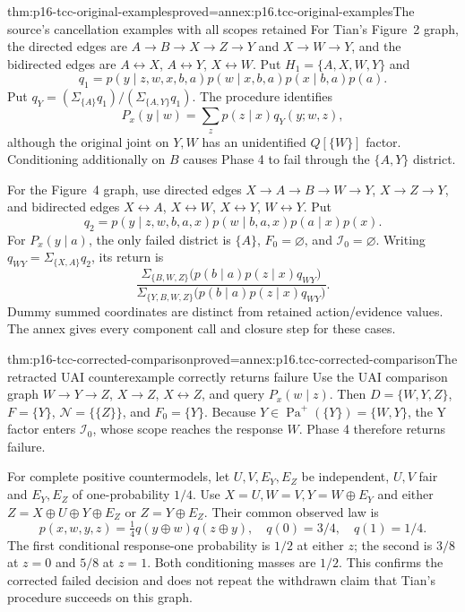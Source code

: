 \begin{hbtheorem}{thm:p16-tcc-original-examples}{proved=annex:p16.tcc-original-examples}{The source's cancellation examples with all scopes retained}
For Tian's Figure~2 graph, the directed edges are
\(A\to B\to X\to Z\to Y\) and \(X\to W\to Y\),
and the bidirected edges are \(A\leftrightarrow X\),
\(A\leftrightarrow Y\), \(X\leftrightarrow W\).
Put \(H_1=\{A,X,W,Y\}\) and
\[
 q_1=p(y\mid z,w,x,b,a)p(w\mid x,b,a)p(x\mid b,a)p(a).
\]
Put \(q_Y=(\Sigma_{\{A\}}q_1)/(\Sigma_{\{A,Y\}}q_1)\).
The procedure identifies
\[
 P_x(y\mid w)=\sum_z p(z\mid x)q_Y(y;w,z),
\]
although the original joint on \(Y,W\) has an unidentified
\(Q[\{W\}]\) factor. Conditioning additionally on \(B\)
causes Phase 4 to fail through the \(\{A,Y\}\) district.

For the Figure~4 graph, use directed edges
\(X\to A\to B\to W\to Y\), \(X\to Z\to Y\),
and bidirected edges \(X\leftrightarrow A\),
\(X\leftrightarrow W\), \(X\leftrightarrow Y\),
\(W\leftrightarrow Y\). Put
\[
 q_2=p(y\mid z,w,b,a,x)p(w\mid b,a,x)p(a\mid x)p(x).
\]
For \(P_x(y\mid a)\), the only failed district is \(\{A\}\),
\(F_0=\varnothing\), and \(\mathcal I_0=\varnothing\).
Writing \(q_{WY}=\Sigma_{\{X,A\}}q_2\), its return is
\[
 \frac{\Sigma_{\{B,W,Z\}}\bigl(p(b\mid a)p(z\mid x)q_{WY}\bigr)}
      {\Sigma_{\{Y,B,W,Z\}}\bigl(p(b\mid a)p(z\mid x)q_{WY}\bigr)}.
\]
Dummy summed coordinates are distinct from retained action/evidence values.
The annex gives every component call and closure step for these cases.
\end{hbtheorem}

\begin{hbtheorem}{thm:p16-tcc-corrected-comparison}{proved=annex:p16.tcc-corrected-comparison}{The retracted UAI counterexample correctly returns failure}
Use the UAI comparison graph \(W\to Y\to Z\),
\(X\to Z\), \(X\leftrightarrow Z\), and query
\(P_x(w\mid z)\). Then \(D=\{W,Y,Z\}\),
\(F=\{Y\}\), \(\mathcal N=\{\{Z\}\}\), and
\(F_0=\{Y\}\). Because
\(Y\in\operatorname{Pa}^{+}(\{Y\})=\{W,Y\}\),
the Y factor enters \(\mathcal I_0\), whose scope reaches
the response \(W\). Phase 4 therefore returns failure.

For complete positive countermodels, let \(U,V,E_Y,E_Z\)
be independent, \(U,V\) fair and \(E_Y,E_Z\) of
one-probability \(1/4\). Use \(X=U,W=V,Y=W\oplus E_Y\)
and either \(Z=X\oplus U\oplus Y\oplus E_Z\) or
\(Z=Y\oplus E_Z\). Their common observed law is
\[
 p(x,w,y,z)=\tfrac14 q(y\oplus w)q(z\oplus y),
 \quad q(0)=3/4,\quad q(1)=1/4.
\]
The first conditional response-one probability is \(1/2\) at
either \(z\); the second is \(3/8\) at \(z=0\) and
\(5/8\) at \(z=1\). Both conditioning masses are \(1/2\).
This confirms the corrected failed decision and does not repeat the
withdrawn claim that Tian's procedure succeeds on this graph.
\end{hbtheorem}

